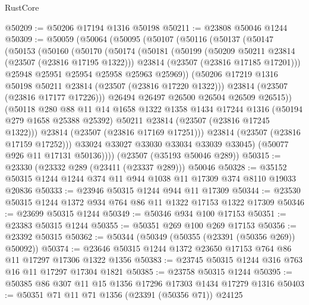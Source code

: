 \begin{lexlean}{RustCore}
\begin{coremodule}
@50209 := @50206 @17194 @1316 @50198
@50211 := @23808 @50046 @1244
@50309 := @50059
    (@50064
      (@50095
        (@50107
          (@50116
            (@50137
              (@50147
                (@50153
                  (@50160
                    (@50170
                      (@50174
                        (@50181
                          (@50199
                            (@50209 @50211 @23814 (@23507 (@23816 @17195 @1322)))
                            @23814
                            (@23507 (@23816 @17185 @17201)))
                          @25948
                          @25951
                          @25954
                          @25958
                          @25963
                          @25969))
                      (@50206 @17219 @1316 @50198 @50211 @23814 (@23507 (@23816 @17220 @1322)))
                      @23814
                      (@23507 (@23816 @17177 @17226)))
                    @26494
                    @26497
                    @26500
                    @26504
                    @26509
                    @26515))
                (@50118
                  @280
                  @88
                  @11
                  @14
                  @1658
                  @1322
                  @1358
                  @1434
                  @17244
                  @1316
                  (@50194 @279 @1658 @25388 @25392)
                  @50211
                  @23814
                  (@23507 (@23816 @17245 @1322)))
                @23814
                (@23507 (@23816 @17169 @17251)))
              @23814
              (@23507 (@23816 @17159 @17252)))
            @33024
            @33027
            @33030
            @33034
            @33039
            @33045)
          (@50077 @926 @11 @17131 @50136))))
    (@23507 (@35193 @50046 @289))
@50315 := @23330 (@23332 @289 (@23411 (@23337 @289))) @50046
@50328 := @35152 @50315 @1244 @1244 @374 @11 @944 @1038 @11 @17309 @374 @8110 @19033 @20836
@50333 := @23946 @50315 @1244 @944 @11 @17309
@50344 := @23530 @50315 @1244 @1372 @934 @764 @86 @11 @1322 @17153 @1322 @17309
@50346 := @23699 @50315 @1244
@50349 := @50346 @934 @100 @17153
@50351 := @23383 @50315 @1244
@50355 := @50351 @269 @100 @269 @17153
@50356 := @23392 @50315
@50362 := @50344 (@50349 (@50355 (@23391 (@50356 @269)) @50092))
@50374 := @23646 @50315 @1244 @1372 @23650 @17153 @764 @86 @11 @17297 @17306 @1322 @1356
@50383 := @23745 @50315 @1244 @316 @763 @16 @11 @17297 @17304 @1821
@50385 := @23758 @50315 @1244
@50395 := @50385 @86 @307 @11 @15 @1356 @17296 @17303 @1434 @17279 @1316
@50403 := @50351 @71 @11 @71 @1356 (@23391 (@50356 @71)) @24125

\end{coremodule}
\end{lexlean}
